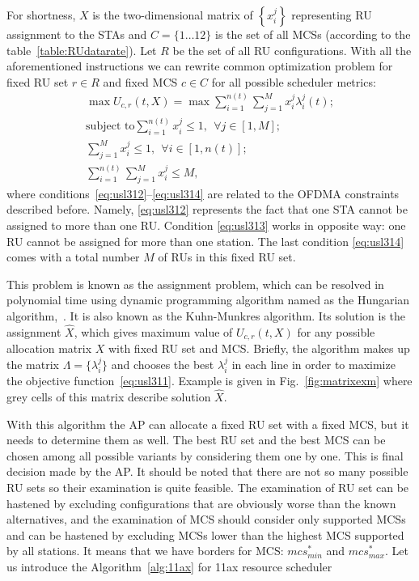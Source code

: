 For shortness, $X$ is the two-dimensional matrix of $\left\{x_i^j\right\}$ representing RU assignment to the STAs and $C = \{1\dots12\}$ is the set of all MCSs (according to the table~\ref{table:RUdatarate}). Let $R$ be the set of all RU configurations. With all the aforementioned instructions we can rewrite common optimization problem for fixed RU set $r \in R$ and fixed MCS $c \in C$ for all possible scheduler metrics:
\begin{align} \label{eq:usl311}
\max U_{c, r}(t,X) = \max \sum^{n(t)}_{i = 1} \sum_{j = 1}^{M} x_i^j \lambda_i^j(t); \\ \label{eq:usl312}
\text{subject to} \sum_{i=1}^{n(t)} x_i^j \leq 1,\ \  \forall j \in [1,M]; \\ \label{eq:usl313}
\sum_{j = 1}^{M} x_i^j \leq 1, \ \ \forall i \in [1, n(t)]; \\ \label{eq:usl314}
\sum_{i = 1}^{n(t)} \sum_{j = 1}^{M} x_i^j \leq M,
\end{align}
where conditions~\eqref{eq:usl312}--\eqref{eq:usl314} are related to the OFDMA  constraints described before. 
Namely, \eqref{eq:usl312} represents the fact that one STA cannot be assigned to more than one RU. Condition \eqref{eq:usl313} works in opposite way: one RU cannot be assigned for more than one station. The last condition \eqref{eq:usl314} comes with a total number $M$ of RUs in this fixed RU set.

This problem is known as the assignment problem, which can be resolved in polynomial time using dynamic programming algorithm named as the Hungarian algorithm,~\cite{bourgeois1971extension}.
It is also known as the Kuhn-Munkres algorithm. 
Its solution is the assignment $\hat X$, which gives maximum value of $U_{c, r}(t,X)$  for any possible allocation matrix $X$ with fixed RU set and MCS. 
Briefly, the algorithm makes up the matrix $\Lambda = \{\lambda_i^j\}$ and chooses the best $\lambda_i^j$ in each line in order to maximize the objective function~\eqref{eq:usl311}. Example is given in Fig.~\ref{fig:matrixexm} where grey cells of this matrix describe solution $\hat X$. 

With this algorithm the AP can allocate a fixed RU set with a fixed MCS, but it needs to determine them as well. The best RU set and the best MCS can be chosen among all possible variants by considering them one by one. This is final decision made by the AP. 
It should be noted that there are not so many possible RU sets so their examination is quite feasible.
The examination of RU set can be hastened by excluding configurations that are obviously worse than the known alternatives, and the examination of MCS should consider only supported MCSs and can be hastened by excluding MCSs lower than the highest MCS supported by all stations. It means that we have borders for MCS: $mcs^{*}_{min}$ and $mcs^{*}_{max}$. Let us introduce the Algorithm~\ref{alg:11ax} for 11ax resource scheduler 


